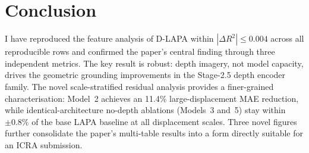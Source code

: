 \documentclass[11pt]{article}
\begin{document}
\section{Conclusion}

I have reproduced the feature analysis of D-LAPA within $|\Delta R^2| \le
0.004$ across all reproducible rows and confirmed the paper's central finding
through three independent metrics.
The key result is robust: depth imagery, not model capacity, drives the
geometric grounding improvements in the Stage-2.5 depth encoder family.
The novel scale-stratified residual analysis provides a finer-grained
characterisation: Model~2 achieves an 11.4\% large-displacement MAE reduction,
while identical-architecture no-depth ablations (Models~3 and~5) stay within
$\pm 0.8\%$ of the base LAPA baseline at all displacement scales.
Three novel figures further consolidate the paper's multi-table results into
a form directly suitable for an ICRA submission.
\end{document}
